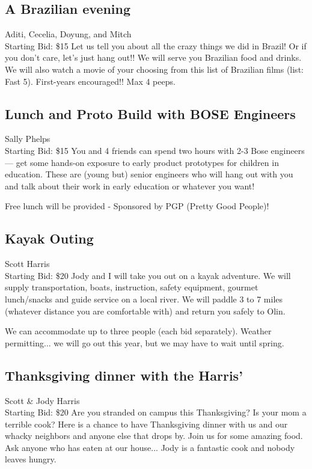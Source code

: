 \documentclass[11pt]{article}
\begin{document}
\subsection{A Brazilian evening}
Aditi, Cecelia, Doyung, and Mitch
\\
Starting Bid: \$15
\newline
Let us tell you about all the crazy things we did in Brazil! Or if you don't care, let's just hang out!! We will serve you Brazilian food and drinks. We will also watch a movie of your choosing from this list of Brazilian films (list: Fast 5). First-years encouraged!! Max 4 peeps.
\subsection{Lunch and Proto Build with BOSE Engineers}
Sally Phelps
\\
Starting Bid: \$15
\newline
You and 4 friends can spend two hours with 2-3 Bose engineers –– get some hands-on exposure to early product prototypes for children in education.   These are (young but) senior engineers who will hang out with you and talk about their work in early education or whatever you want!
 
Free lunch will be provided - Sponsored by PGP (Pretty Good People)!
\subsection{Kayak Outing}
Scott Harris
\\
Starting Bid: \$20
\newline
Jody and I will take you out on a kayak adventure. We will supply transportation, boats, instruction, safety equipment, gourmet lunch/snacks and guide service on a local river. We will paddle 3 to 7 miles (whatever distance you are comfortable with) and return you safely to Olin.

We can accommodate up to three people (each bid separately).
Weather permitting... we will go out this year, but we may have to wait until spring.
\subsection{Thanksgiving dinner with the Harris'}
Scott \& Jody Harris
\\
Starting Bid: \$20
\newline
Are you stranded on campus this Thanksgiving? Is your mom a terrible cook? Here is a chance to have Thanksgiving dinner with us and our whacky neighbors and anyone else that drops by. Join us for some amazing food. Ask anyone who has eaten at our house... Jody is a fantastic cook and nobody leaves hungry. 
\end{document}
